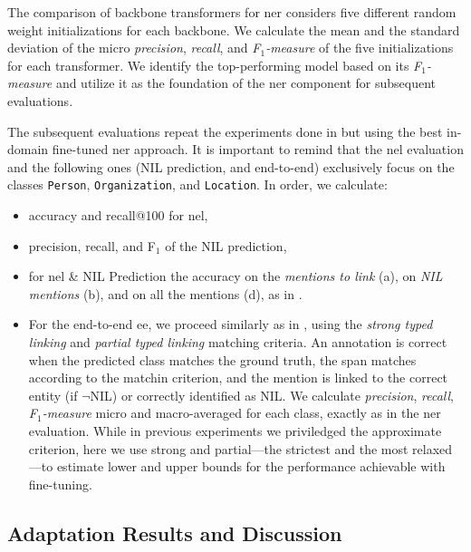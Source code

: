 The comparison of backbone transformers for \ac{ner} considers five different random weight initializations for each backbone. We calculate the mean and the standard deviation of the micro \textit{precision}, \textit{recall}, and \textit{F$_1$-measure} of the five initializations for each transformer.
We identify the top-performing model based on its \textit{F$_1$-measure} and utilize it as the foundation of the \ac{ner} component for subsequent evaluations.

The subsequent evaluations repeat the experiments done in  but using the best in-domain fine-tuned \ac{ner} approach. 
It is important to remind that the \ac{nel} evaluation and the following ones (NIL prediction, and end-to-end) exclusively focus on the classes \texttt{Person}, \texttt{Organization}, and \texttt{Location}. In order, we calculate:
\begin{itemize}
    \item accuracy and recall@100 for \ac{nel},
    \item precision, recall, and F$_1$ of the NIL prediction,
    \item for \ac{nel} \& NIL Prediction the accuracy on the \textit{mentions to link} (a), on \textit{NIL mentions} (b), and on all the mentions (d), as in .
    \item For the end-to-end \ac{ee}, we proceed similarly as in , using the \textit{strong typed linking} and \textit{partial typed linking} matching criteria. An annotation is correct when the predicted class matches the ground truth, the span matches according to the matchin criterion, and the mention is linked to the correct entity (if $\neg$NIL) or correctly identified as NIL. We calculate \textit{precision}, \textit{recall}, \textit{F$_1$-measure} micro and macro-averaged for each class, exactly as in the \ac{ner} evaluation. While in previous experiments we priviledged the approximate criterion, here we use strong and partial---the strictest and the most relaxed---to estimate lower and upper bounds for the performance achievable with fine-tuning.
\end{itemize}


\subsection{Adaptation Results and Discussion}

